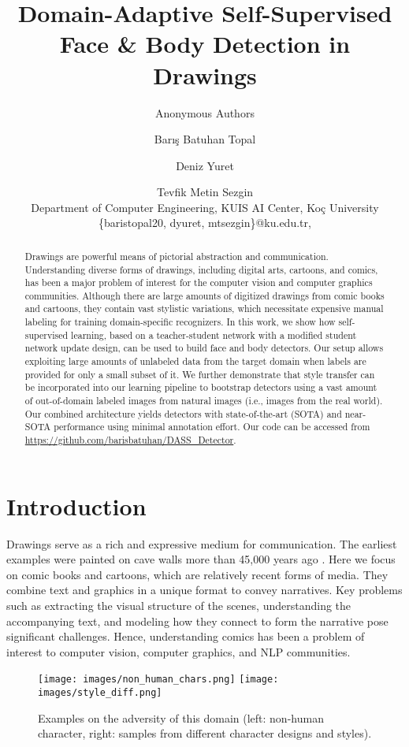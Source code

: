 \documentclass{article}
\title{Domain-Adaptive Self-Supervised Face \& Body Detection in Drawings}
\author{Anonymous Authors}
\author{
Barış Batuhan Topal \and
Deniz Yuret \and
Tevfik Metin Sezgin \\
\affiliations
Department of Computer Engineering, KUIS AI Center, Koç University\\
\emails
\{baristopal20, dyuret, mtsezgin\}@ku.edu.tr,
}
\begin{document}
\maketitle

\begin{abstract}
    Drawings are powerful means of pictorial abstraction and communication. Understanding diverse forms of drawings, including digital arts, cartoons, and comics, has been a major problem of interest for the computer vision and computer graphics communities. Although there are large amounts of digitized drawings from comic books and cartoons, they contain vast stylistic variations, which necessitate expensive manual labeling for training domain-specific recognizers. In this work, we show how self-supervised learning, based on a teacher-student network with a modified student network update design, can be used to build face and body detectors. Our setup allows exploiting large amounts of unlabeled data from the target domain when labels are provided for only a small subset of it. We further demonstrate that style transfer can be incorporated into our learning pipeline to bootstrap detectors using a vast amount of out-of-domain labeled images from natural images (i.e., images from the real world). Our combined architecture yields detectors with state-of-the-art (SOTA) and near-SOTA performance using minimal annotation effort. Our code can be accessed from {\selectfont \url{https://github.com/barisbatuhan/DASS_Detector}}.
\end{abstract}

\section{Introduction}

Drawings serve as a rich and expressive medium for communication. The earliest examples were painted on cave walls more than 45,000 years ago \cite{brumm2021oldest}. Here we focus on comic books and cartoons, which are relatively recent forms of media. They combine text and graphics in a unique format to convey narratives. Key problems such as extracting the visual structure of the scenes, understanding the accompanying text, and modeling how they connect to form the narrative pose significant challenges. Hence, understanding comics has been a problem of interest to computer vision, computer graphics, and NLP communities.

\begin{figure}
    \centering
    \texttt{[image: images/non\_human\_chars.png]}
    \texttt{[image: images/style\_diff.png]}
    \caption{Examples on the adversity of this domain (left: non-human character, right: samples from different character designs and styles).}
    \label{fig:adversity}
\end{figure}
\end{document}
